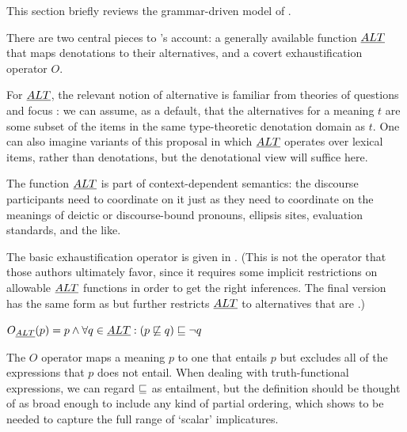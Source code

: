 \documentclass{article}
\begin{document}
\begin{examples}
\item This section briefly reviews the grammar-driven model of \CFS.

\item There are two central pieces to \CFS's account: a generally
  available function $\emph{ALT}$ that maps denotations to their
  alternatives, and a covert exhaustification operator $O$.

\item For $\emph{ALT}$, the relevant notion of alternative is familiar from
  theories of questions and focus
  \citep{Groenendijk84,Rooth85,Rooth92}: we can assume, as a default,
  that the alternatives for a meaning $t$ are some subset of the items
  in the same type-theoretic denotation domain as $t$.  One can also
  imagine variants of this proposal in which $\emph{ALT}$ operates over
  lexical items, rather than denotations, but the denotational view
  will suffice here.

\item The function $\emph{ALT}$ is part of context-dependent semantics: the
  discourse participants need to coordinate on it just as they need to
  coordinate on the meanings of deictic or discourse-bound pronouns,
  ellipsis sites, evaluation standards, and the like.

\item The basic exhaustification operator is given in 
  \citep{Spector:2007,Fox:2007,Fox:2009,Magri:2009,ChierchiaFoxSpector08}. (This
  is not the operator that those authors ultimately favor, since it
  requires some implicit restrictions on allowable $\emph{ALT}$ functions in
  order to get the right inferences.  The final version has the same
  form as  but further restricts $\emph{ALT}$ to alternatives
  that are .)

\item\label{def:O}
  $O_{\emph{ALT}}(p) = p \wedge \forall q \in \emph{ALT} : (p \not\sqsubseteq q) \sqsubseteq \neg q$

\item The $O$ operator maps a meaning $p$ to one that entails $p$ but
  excludes all of the expressions that $p$ does not entail. When
  dealing with truth-functional expressions, we can regard $\sqsubseteq$
  as entailment, but the definition should be thought of as broad
  enough to include any kind of partial ordering, which
   shows to be needed to capture the full
  range of `scalar' implicatures.


\end{examples}
\end{document}
